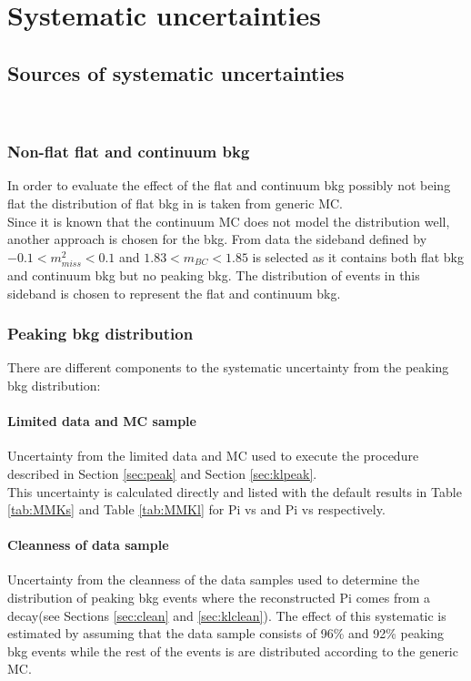 \chapter{Systematic uncertainties}
\label{c:sys}
\section{Sources of systematic uncertainties}
\\
\subsection{Non-flat flat and continuum bkg}
\label{s:flat}
In order to evaluate the effect of the flat and continuum bkg possibly not being flat the distribution of flat bkg in \KsPiPi  is taken from generic MC. \\
Since it is known that the continuum MC does not model the distribution well, another approach is chosen for the \KlPiPi bkg. From data the sideband defined by $-0.1 < m_{miss}^2 < 0.1$ and $1.83 < m_{BC} < 1.85$ is selected as it contains both flat bkg and continuum bkg but no peaking bkg. The distribution of events in this sideband is chosen to represent the flat and continuum bkg.\\


\subsection{Peaking bkg distribution}
\label{s:peak}
There are different components to the systematic uncertainty from the peaking bkg distribution:
\subsubsection{Limited data and MC sample}
\label{s:peaka}
 Uncertainty from the limited data and MC used to execute the procedure described in Section \ref{sec:peak} and Section \ref{sec:klpeak}.\\
	This uncertainty is calculated directly and listed with the default results in Table \ref{tab:MMKs} and Table \ref{tab:MMKl} for \4Pi vs \KsPiPi and \4Pi vs \KlPiPi respectively.\\

\subsubsection{Cleanness of data sample}
\label{s:peakb}
Uncertainty from the cleanness of the data samples used to determine the distribution of peaking bkg events where the reconstructed \4Pi comes from a \KsPiPi decay(see Sections \ref{sec:clean} and \ref{sec:klclean}). The effect of this systematic is estimated by assuming that the data sample consists of 96\% and 92\% peaking bkg events while the rest of the events is are distributed according to the generic MC.\\

